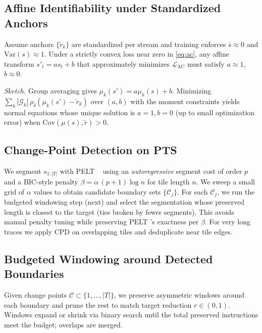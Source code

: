 \documentclass[conference]{IEEEtran}
\newcommand{\Var}{\mathrm{Var}}
\newcommand{\pts}{\textsc{PTS} }
\newcommand{\pelt}{\textsc{PELT} }
\begin{document}
\subsection{Affine Identifiability under Standardized Anchors}
\label{subsec:identifiability}
\begin{proposition}
Assume anchors \(\{\tilde{r}_k\}\) are standardized per stream and training enforces \(\bar{s}\!\approx\!0\) and \(\Var(s)\!\approx\!1\). Under a strictly convex loss near zero in \eqref{eq:ac}, any affine transform \(s'_t=a s_t+b\) that approximately minimizes \(\mathcal{L}_{\mathrm{AC}}\) must satisfy \(a\!\approx\!1\), \(b\!\approx\!0\).
\end{proposition}
\noindent\emph{Sketch.}
Group averaging gives \(\mu_k(s')=a\mu_k(s)+b\). Minimizing \(\sum_k|\mathcal{G}_k|\,\rho_\delta(\mu_k(s')-\tilde{r}_k)\) over \((a,b)\) with the moment constraints yields normal equations whose unique solution is \(a{=}1,b{=}0\) (up to small optimization error) when \(\mathrm{Cov}(\mu(s),\tilde{r})>0\).

\subsection{Change-Point Detection on \pts}
\label{subsec:cpd}
We segment \(s_{1:|T|}\) with \pelt~\cite{pelt12} using an \emph{autoregressive} segment cost of order \(p\) and a BIC-style penalty \(\beta=\alpha\,(p{+}1)\log n\) for tile length \(n\). We sweep a small grid of \(\alpha\) values to obtain candidate boundary sets \(\{\mathcal{C}_j\}\). For each \(\mathcal{C}_j\), we run the budgeted windowing step (next) and select the segmentation whose preserved length is closest to the target (ties broken by fewer segments). This avoids manual penalty tuning while preserving \pelt’s exactness per \(\beta\). For very long traces we apply CPD on overlapping tiles and deduplicate near tile edges.

\subsection{Budgeted Windowing around Detected Boundaries}
Given change points \(\mathcal{C}\subset\{1,\ldots,|T|\}\), we preserve asymmetric windows around each boundary and prune the rest to match target reduction \(r\in(0,1)\). Windows expand or shrink via binary search until the total preserved instructions meet the budget; overlaps are merged.
\end{document}
